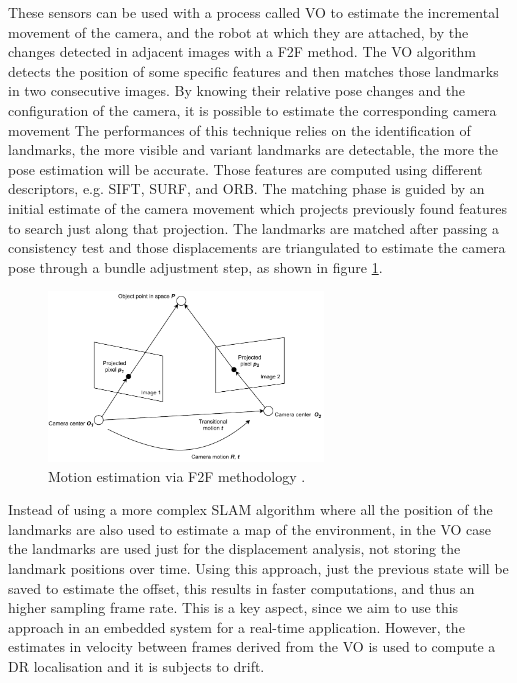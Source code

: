 These sensors can be used with a process called \gls{VO} to estimate the incremental movement of the camera, and the robot at which they are attached, by the changes detected in adjacent images with a \gls{F2F} method.
The \gls{VO} algorithm detects the position of some specific features and then matches those landmarks in two consecutive images.
By knowing their relative pose changes and the configuration of the camera, it is possible to estimate the corresponding camera movement
The performances of this technique relies on the identification of landmarks, the more visible and variant landmarks are detectable, the more the pose estimation will be accurate.
Those features are computed using different descriptors, e.g. \gls{SIFT}, \gls{SURF}, and \gls{ORB}.
The matching phase is guided by an initial estimate of the camera movement which projects previously found features to search just along that projection.
The landmarks are matched after passing a consistency test and those displacements are triangulated to estimate the camera pose through a bundle adjustment step\cite{robustFusion}, as shown in figure \ref{fig:camera}.

\begin{figure}[!ht]
  \begin{center}
    \includegraphics[width=0.65\textwidth]{Images/2-Background/VO.pdf}
  \end{center}
  \caption{Motion estimation via \gls{F2F} methodology \cite{camera}\cite{cameraa}.}
  \label{fig:camera}
\end{figure}

Instead of using a more complex \gls{SLAM} algorithm where all the position of the landmarks are also used to estimate a map of the environment, in the \gls{VO} case the landmarks are used just for the displacement analysis, not storing the landmark positions over time.
Using this approach, just the previous state will be saved to estimate the offset, this results in faster computations, and thus an higher sampling frame rate.
This is a key aspect, since we aim to use this approach in an embedded system for a real-time application. However, the estimates in velocity between frames derived from the \gls{VO} is used to compute a \gls{DR} localisation and it is subjects to drift.

